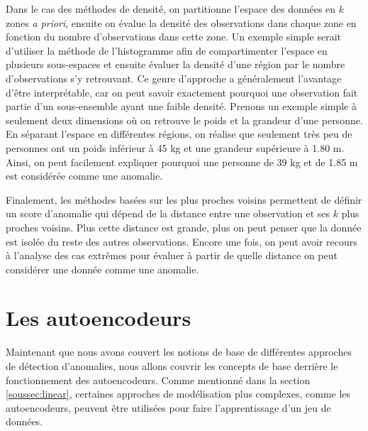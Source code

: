 Dans le cas des méthodes de densité, on partitionne l'espace des données en $k$ zones \textit{a priori}, ensuite on évalue la densité des observations dans chaque zone en fonction du nombre d'observations dans cette zone. Un exemple simple serait d'utiliser la méthode de l'histogramme afin de compartimenter l'espace en plusieurs sous-espaces et ensuite évaluer la densité d'une région par le nombre d'observations s'y retrouvant. Ce genre d'approche a généralement l'avantage d'être interprétable, car on peut savoir exactement pourquoi une observation fait partie d'un sous-ensemble ayant une faible densité. Prenons un exemple simple à seulement deux dimensions où on retrouve le poids et la grandeur d'une personne. En séparant l'espace en différentes régions, on réalise que seulement très peu de personnes ont un poids inférieur à 45 kg et une grandeur supérieure à 1.80 m. Ainsi, on peut facilement expliquer pourquoi une personne de 39 kg et de 1.85 m est considérée comme une anomalie. 
 
 Finalement, les méthodes basées sur les plus proches voisins permettent de définir un score d'anomalie qui dépend de la distance entre une observation et ses $k$ plus proches voisins. Plus cette distance est grande, plus on peut penser que la donnée est isolée du reste des autres observations. Encore une fois, on peut avoir recours à l'analyse des cas extrêmes pour évaluer à partir de quelle distance on peut considérer une donnée comme une anomalie.


\section{Les autoencodeurs}

Maintenant que nous avons couvert les notions de base de différentes approches de détection d'anomalies, nous allons couvrir les concepts de base derrière le fonctionnement des autoencodeurs. Comme mentionné dans la section \ref{soussec:linear}, certaines approches de modélisation plus complexes, comme les autoencodeurs, peuvent être utilisées pour faire l'apprentissage d'un jeu de données. 

